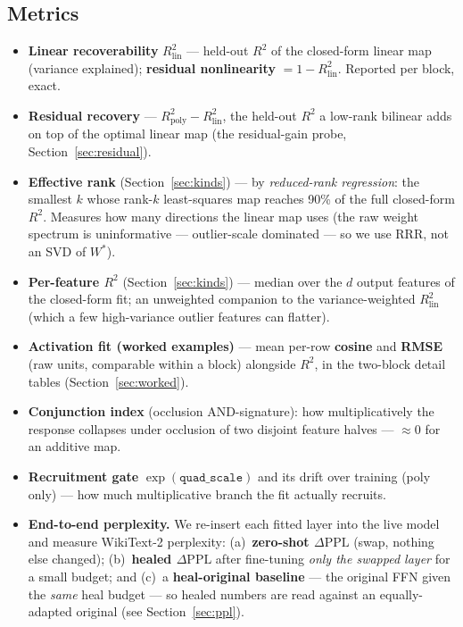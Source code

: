 \documentclass{article}
\newcommand{\Rlin}{R^2_{\mathrm{lin}}}
\newcommand{\Rpoly}{R^2_{\mathrm{poly}}}
\newcommand{\dppl}{\Delta\mathrm{PPL}}
\begin{document}
\subsection{Metrics}
\label{sec:metrics}

\begin{itemize}
\item \textbf{Linear recoverability} $\Rlin$ --- held-out $R^2$ of the closed-form linear map
  (variance explained); \textbf{residual nonlinearity} $= 1-\Rlin$. Reported per block, exact.
\item \textbf{Residual recovery} --- $\Rpoly - \Rlin$, the held-out $R^2$ a low-rank
  bilinear adds on top of the optimal linear map (the residual-gain probe,
  Section~\ref{sec:residual}).
\item \textbf{Effective rank} (Section~\ref{sec:kinds}) --- by \emph{reduced-rank regression}:
  the smallest $k$ whose rank-$k$ least-squares map reaches 90\% of the full closed-form $R^2$.
  Measures how many directions the linear map uses (the raw weight spectrum is uninformative
  --- outlier-scale dominated --- so we use RRR, not an SVD of $W^{*}$).
\item \textbf{Per-feature $R^2$} (Section~\ref{sec:kinds}) --- median over the $d$ output
  features of the closed-form fit; an unweighted companion to the variance-weighted $\Rlin$
  (which a few high-variance outlier features can flatter).
\item \textbf{Activation fit (worked examples)} --- mean per-row \textbf{cosine} and
  \textbf{RMSE} (raw units, comparable within a block) alongside $R^2$, in the two-block
  detail tables (Section~\ref{sec:worked}).
\item \textbf{Conjunction index} (occlusion AND-signature): how multiplicatively the response
  collapses under occlusion of two disjoint feature halves --- $\approx 0$ for an additive map.
\item \textbf{Recruitment gate} $\exp(\texttt{quad\_scale})$ and its drift over training
  (poly only) --- how much multiplicative branch the fit actually recruits.
\item \textbf{End-to-end perplexity.} We re-insert each fitted layer into the live model and
  measure WikiText-2 perplexity: (a)~\textbf{zero-shot $\dppl$} (swap, nothing else changed);
  (b)~\textbf{healed $\dppl$} after fine-tuning \emph{only the swapped layer} for a small
  budget; and (c)~a \textbf{heal-original baseline} --- the original FFN given the \emph{same}
  heal budget --- so healed numbers are read against an equally-adapted original (see
  Section~\ref{sec:ppl}).
\end{itemize}
\end{document}
